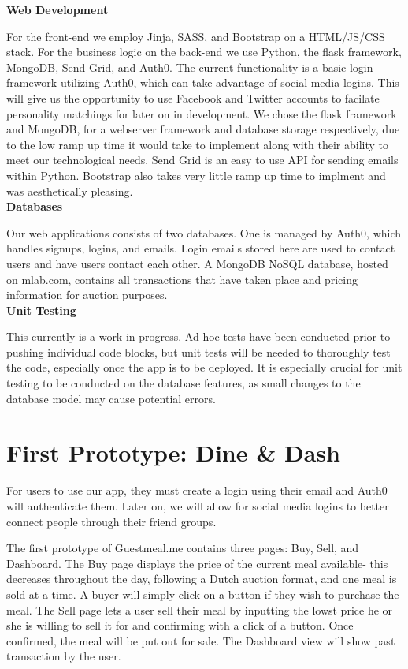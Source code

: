 \documentclass[column,12pt]{article}
\begin{document}
\textbf{Web Development}

For the front-end we employ Jinja, SASS, and Bootstrap on a HTML/JS/CSS stack. For the business logic on the back-end we use Python, the flask framework, MongoDB, Send Grid, and Auth0. The current functionality is a basic login framework utilizing Auth0, which can take advantage of social media logins. This will give us the opportunity to use  Facebook and Twitter accounts to facilate personality matchings for later on in development. We chose the flask framework and MongoDB, for
a webserver framework and database storage respectively, due to the low ramp up time it would take to implement along with their ability to meet our technological needs. Send Grid is an easy to use API for sending emails within Python. Bootstrap also takes very little ramp up time to implment and was aesthetically pleasing.\\

\textbf{Databases}

Our web applications consists of two databases. One is managed by Auth0, which handles signups, logins, and emails. Login emails stored here are used to contact users and have users contact each other. A MongoDB NoSQL database, hosted on mlab.com, contains all transactions that have taken place and pricing information for auction purposes. \\

\textbf{Unit Testing}

This currently is a work in progress. Ad-hoc tests have been conducted prior to pushing individual code blocks, but unit tests will be needed to thoroughly test the code, especially once the app is to be deployed. It is especially crucial for unit testing to be conducted on the database features, as small changes to the database model may cause potential errors. \\

\section{First Prototype: Dine \& Dash}
For users to use our app, they must create a login using their email and Auth0 will authenticate them. Later on, we will allow for social media logins to better connect people through their friend groups. 

The first prototype of Guestmeal.me contains three pages: Buy, Sell, and Dashboard. The Buy page displays the price of the current meal available- this decreases throughout the day, following a Dutch auction format, and one meal is sold at a time. A buyer will simply click on a button if they wish to purchase the meal. The Sell page lets a user sell their meal by inputting the lowst price he or she is willing to sell it for and confirming with a click of a button. Once confirmed, the meal will be put out for sale. The Dashboard view will show past transaction by the user.
\end{document}
